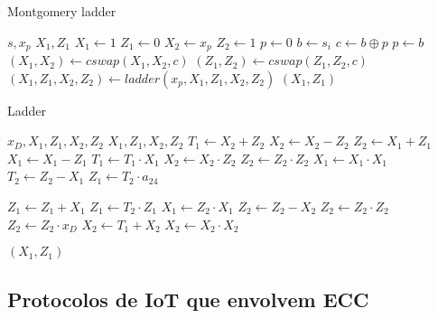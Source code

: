 \begin{algorithm}[H]
\caption{Montgomery ladder}
\begin{algorithmic} 
    \REQUIRE $s, x_p$
    \ENSURE $X_1, Z_1$
    \STATE $X_1 \leftarrow 1$
    \STATE $Z_1 \leftarrow 0$
    \STATE $X_2 \leftarrow x_p$
    \STATE $Z_2 \leftarrow 1$
    \STATE $p \leftarrow 0$
        \STATE $b \leftarrow s_i$
        \STATE $c \leftarrow b \oplus p$
        \STATE $p \leftarrow b$
        \STATE $(X_1, X_2) \leftarrow cswap(X_1,X_2,c)$
        \STATE $(Z_1,Z_2) \leftarrow cswap(Z_1,Z_2,c)$
        \STATE $(X_1, Z_1, X_2, Z_2) \leftarrow ladder(x_p, X_1, Z_1, X_2, Z_2)$
    \ENDFOR
    \RETURN $(X_1,Z_1)$
    \end{algorithmic}
\end{algorithm}

\begin{algorithm}[H]
\caption{Ladder}
\begin{multicols}{2}
\begin{algorithmic} 
    \REQUIRE $x_D, X_1, Z_1, X_2, Z_2$
    \ENSURE $X_1, Z_1, X_2, Z_2$
    \STATE $T_1 \leftarrow X_2 + Z_2$
    \STATE $X_2 \leftarrow X_2 - Z_2$
    \STATE $Z_2 \leftarrow X_1 + Z_1$
    \STATE $X_1 \leftarrow X_1 - Z_1$
    \STATE $T_1 \leftarrow T_1 \cdot X_1$
    \STATE $X_2 \leftarrow X_2 \cdot Z_2$
    \STATE $Z_2 \leftarrow Z_2 \cdot Z_2$
    \STATE $X_1 \leftarrow X_1 \cdot X_1$
    \STATE $T_2 \leftarrow Z_2 - X_1$
    \STATE $Z_1 \leftarrow T_2 \cdot a_24$
    
    
    \STATE $Z_1 \leftarrow Z_1 + X_1$
    \STATE $Z_1 \leftarrow T_2 \cdot Z_1$
    \STATE $X_1 \leftarrow Z_2 \cdot X_1$
    \STATE $Z_2 \leftarrow Z_2 - X_2$
    \STATE $Z_2 \leftarrow Z_2 \cdot Z_2$
    \STATE $Z_2 \leftarrow Z_2 \cdot x_D$
    \STATE $X_2 \leftarrow T_1 + X_2$
    \STATE $X_2 \leftarrow X_2 \cdot X_2$
    
    \RETURN $(X_1,Z_1)$
\end{algorithmic}
\end{multicols}
\end{algorithm}

\subsection{Protocolos de IoT que envolvem ECC}